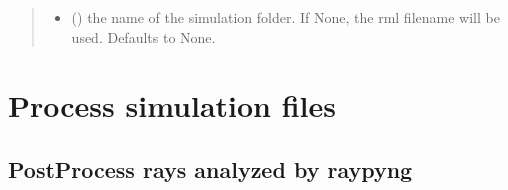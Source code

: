 \documentclass[letterpaper,10pt,english]{sphinxmanual}
\begin{document}
\begin{fulllineitems}
\begin{quote}
\begin{description}
\begin{itemize}
\item {} 
\sphinxAtStartPar
{} (\sphinxstyleliteralemphasis{\sphinxupquote{, }}) \textendash{} the name of the simulation folder. If None, the rml
filename will be used. Defaults to None.

\end{itemize}

\end{description}\end{quote}

\end{fulllineitems}



\section{Process simulation files}
\label{\detokenize{API:process-simulation-files}}

\subsection{PostProcess rays analyzed by raypyng}
\label{\detokenize{API:postprocess-rays-analyzed-by-raypyng}}
\end{document}
